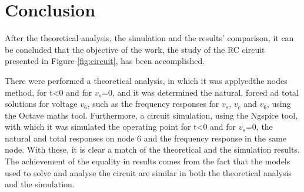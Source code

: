 \section{Conclusion}
\label{sec:conclusion}

After the theoretical analysis, the simulation and the results' comparison, it can be
concluded that the objective of the work, the study of the RC circuit presented in
Figure-\ref{fig:circuit}, has been accomplished.\par
There were performed a theoretical analysis, in which it was applyedthe nodes method,
for t<0 and for $v_s$=0, and it was determined the natural, forced ad total solutions for
voltage $v_6$, such as the frequency responses for $v_s$, $v_c$ and $v_6$, using the Octave
maths tool. Furthermore, a circuit simulation, using the Ngspice tool, with which it was
simulated the operating point for t<0 and for $v_s$=0, the natural and total responses on node 6
and the frequency response in the same node. With these, it is clear a match of the theoretical
and the simulation results. The achievement of the equality in results comes from the fact that the models used to solve and analyse the circuit are similar in both the theoretical analysis and the simulation.

